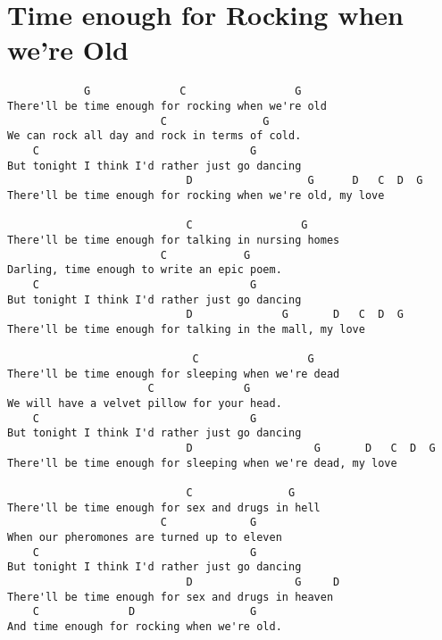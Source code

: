 \documentclass[leqno]{memoir}
\begin{document}
\chapter{Time enough for Rocking when we're Old}
\begin{verbatim}
            G              C                 G
There'll be time enough for rocking when we're old
                        C               G
We can rock all day and rock in terms of cold.
    C                                 G      
But tonight I think I'd rather just go dancing
                            D                  G      D   C  D  G
There'll be time enough for rocking when we're old, my love

                            C                 G
There'll be time enough for talking in nursing homes
                        C            G
Darling, time enough to write an epic poem.
    C                                 G                                
But tonight I think I'd rather just go dancing
                            D              G       D   C  D  G
There'll be time enough for talking in the mall, my love

                             C                 G
There'll be time enough for sleeping when we're dead
                      C              G
We will have a velvet pillow for your head.
    C                                 G         
But tonight I think I'd rather just go dancing
                            D                   G       D   C  D  G
There'll be time enough for sleeping when we're dead, my love

                            C               G
There'll be time enough for sex and drugs in hell
                        C             G
When our pheromones are turned up to eleven
    C                                 G    
But tonight I think I'd rather just go dancing
                            D                G     D  
There'll be time enough for sex and drugs in heaven 
    C              D                  G
And time enough for rocking when we're old.
\end{verbatim}
\newpage
\end{document}
